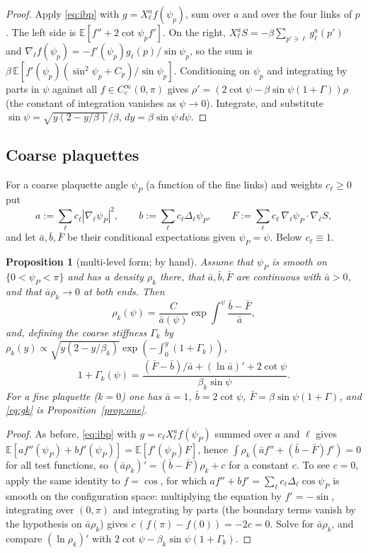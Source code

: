 \documentclass[11pt,a4paper]{article}
\newtheorem{proposition}[theorem]{Proposition}
\theoremstyle{definition}
\theoremstyle{remark}
\newcommand{\E}{\mathbb{E}}
\newcommand{\abar}{\bar a}
\newcommand{\bbar}{\bar b}
\newcommand{\Fbar}{\bar F}
\begin{document}
\begin{proof}
Apply \eqref{eq:ibp} with $g=X^a_\ell f(\psi_p)$, sum over $a$ and over the four links of $p$. The left side is $\E[f''+2\cot\psi_p f']$. On the right, $X^a_\ell S=-\beta\sum_{p'\ni\ell}g^a_\ell(p')$ and $\nabla_\ell f(\psi_p)=-f'(\psi_p)g_\ell(p)/\sin\psi_p$, so the sum is $\beta\,\E[f'(\psi_p)(\sin^2\psi_p+C_p)/\sin\psi_p]$. Conditioning on $\psi_p$ and integrating by parts in $\psi$ against all $f\in C_c^\infty(0,\pi)$ gives $\rho'=(2\cot\psi-\beta\sin\psi(1+\Gamma))\rho$ (the constant of integration vanishes as $\psi\to0$). Integrate, and substitute $\sin\psi=\sqrt{y(2-y/\beta)}/\beta$, $dy=\beta\sin\psi\,d\psi$.
\end{proof}

\subsection{Coarse plaquettes}

For a coarse plaquette angle $\psi_P$ (a function of the fine links) and weights $c_\ell\ge0$ put
\[
a:=\sum_\ell c_\ell|\nabla_\ell\psi_P|^2,\qquad b:=\sum_\ell c_\ell\Delta_\ell\psi_P,\qquad F:=\sum_\ell c_\ell\,\nabla_\ell\psi_P\cdot\nabla_\ell S,
\]
and let $\abar,\bbar,\Fbar$ be their conditional expectations given $\psi_P=\psi$. Below $c_\ell\equiv1$.

\begin{proposition}[multi-level form; by hand]\label{prop:multi}
Assume that $\psi_P$ is smooth on $\{0<\psi_P<\pi\}$ and has a density $\rho_k$ there, that $\abar,\bbar,\Fbar$ are continuous with $\abar>0$, and that $\abar\rho_k\to0$ at both ends. Then
\[
\rho_k(\psi)=\frac{C}{\abar(\psi)}\exp\int^\psi\frac{\bbar-\Fbar}{\abar},
\]
and, defining the coarse stiffness $\Gamma_k$ by $\rho_k(y)\propto\sqrt{y(2-y/\beta_k)}\exp(-\int_0^y(1+\Gamma_k))$,
\begin{equation}\label{eq:gk}
1+\Gamma_k(\psi)=\frac{(\Fbar-\bbar)/\abar+(\ln\abar)'+2\cot\psi}{\beta_k\sin\psi}.
\end{equation}
For a fine plaquette ($k=0$) one has $\abar=1$, $\bbar=2\cot\psi$, $\Fbar=\beta\sin\psi(1+\Gamma)$, and \eqref{eq:gk} is Proposition~\ref{prop:one}.
\end{proposition}

\begin{proof}
As before, \eqref{eq:ibp} with $g=c_\ell X^a_\ell f(\psi_P)$ summed over $a$ and $\ell$ gives $\E[af''(\psi_P)+bf'(\psi_P)]=\E[f'(\psi_P)F]$, hence $\int\rho_k(\abar f''+(\bbar-\Fbar)f')=0$ for all test functions, so $(\abar\rho_k)'=(\bbar-\Fbar)\rho_k+c$ for a constant $c$. To see $c=0$, apply the same identity to $f=\cos$, for which $af''+bf'=\sum_\ell c_\ell\Delta_\ell\cos\psi_P$ is smooth on the configuration space: multiplying the equation by $f'=-\sin$, integrating over $(0,\pi)$ and integrating by parts (the boundary terms vanish by the hypothesis on $\abar\rho_k$) gives $c\,(f(\pi)-f(0))=-2c=0$. Solve for $\abar\rho_k$, and compare $(\ln\rho_k)'$ with $2\cot\psi-\beta_k\sin\psi(1+\Gamma_k)$.
\end{proof}
\end{document}

